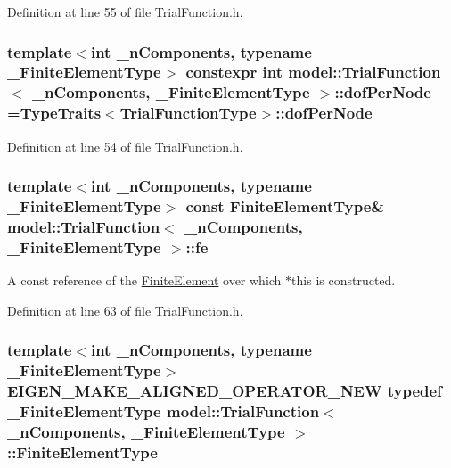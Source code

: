 Definition at line 55 of file Trial\+Function.\+h.

\hypertarget{classmodel_1_1_trial_function_ad23735e6005fbc863c2f722f343c15e4}{}
\subsubsection[{dof\+Per\+Node}]{\setlength{\rightskip}{0pt plus 5cm}template$<$int \+\_\+n\+Components, typename \+\_\+\+Finite\+Element\+Type$>$ constexpr int {\bf model\+::\+Trial\+Function}$<$ \+\_\+n\+Components, \+\_\+\+Finite\+Element\+Type $>$\+::dof\+Per\+Node ={\bf Type\+Traits}$<${\bf Trial\+Function\+Type}$>$\+::dof\+Per\+Node\hspace{0.3cm}{\ttfamily [static]}}\label{classmodel_1_1_trial_function_ad23735e6005fbc863c2f722f343c15e4}


Definition at line 54 of file Trial\+Function.\+h.

\hypertarget{classmodel_1_1_trial_function_a808f99f04cba2e6c93d030771538861d}{}
\subsubsection[{fe}]{\setlength{\rightskip}{0pt plus 5cm}template$<$int \+\_\+n\+Components, typename \+\_\+\+Finite\+Element\+Type$>$ const {\bf Finite\+Element\+Type}\& {\bf model\+::\+Trial\+Function}$<$ \+\_\+n\+Components, \+\_\+\+Finite\+Element\+Type $>$\+::fe}\label{classmodel_1_1_trial_function_a808f99f04cba2e6c93d030771538861d}


A const reference of the \hyperlink{classmodel_1_1_finite_element}{Finite\+Element} over which $\ast$this is constructed. 



Definition at line 63 of file Trial\+Function.\+h.

\hypertarget{classmodel_1_1_trial_function_affdabe3315d0208c9b2210c3cbee6d42}{}
\subsubsection[{Finite\+Element\+Type}]{\setlength{\rightskip}{0pt plus 5cm}template$<$int \+\_\+n\+Components, typename \+\_\+\+Finite\+Element\+Type$>$ E\+I\+G\+E\+N\+\_\+\+M\+A\+K\+E\+\_\+\+A\+L\+I\+G\+N\+E\+D\+\_\+\+O\+P\+E\+R\+A\+T\+O\+R\+\_\+\+N\+E\+W typedef \+\_\+\+Finite\+Element\+Type {\bf model\+::\+Trial\+Function}$<$ \+\_\+n\+Components, \+\_\+\+Finite\+Element\+Type $>$\+::Finite\+Element\+Type}\label{classmodel_1_1_trial_function_affdabe3315d0208c9b2210c3cbee6d42}


